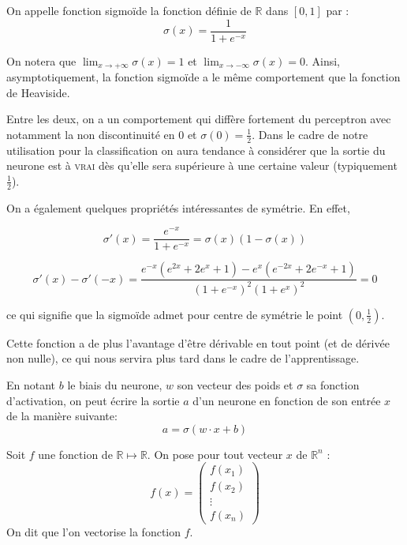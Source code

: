 \begin{definition}
On appelle fonction sigmoïde la fonction définie de $\mathbb{R}$ dans $[0, 1]$ par :
\[
\sigma(x) = \frac{1}{1 + e^{-x}}
\]
\end{definition}

On notera que $\lim_{x \to +\infty} \sigma(x) = 1$ et $\lim_{x \to -\infty} \sigma(x) = 0$. 
Ainsi, asymptotiquement, la fonction sigmoïde a le même comportement que la fonction 
de Heaviside.

Entre les deux, on a un comportement qui diffère fortement du perceptron avec notamment 
la non discontinuité en 0 et $\sigma(0) = \frac{1}{2}$. 
Dans le cadre de notre utilisation pour la classification on aura tendance 
à considérer que la sortie du neurone est à \textsc{vrai} dès qu'elle sera supérieure 
à une certaine valeur (typiquement $\frac{1}{2}$).

On a également quelques propriétés intéressantes de symétrie. En effet,

\[
\sigma'(x) = \frac{e^{-x}}{1 + e^{-x}} = \sigma(x) (1 - \sigma(x))
\]

\[
\sigma'(x) - \sigma'(-x) = \frac{e^{-x}(e^{2x} + 2 e^{x} + 1) - e^{x}(e^{-2x} + 2 e^{-x} + 1)}{(1+e^{-x})^2 (1+e^{x})^2} = 0
\]

ce qui signifie que la sigmoïde admet pour centre de symétrie le point $(0, \frac{1}{2})$.

Cette fonction a de plus l'avantage d'être dérivable en tout point (et de dérivée non nulle), 
ce qui nous servira plus tard dans le cadre de l'apprentissage.


\begin{definition}
En notant $b$ le biais du neurone, $w$ son vecteur des poids et $\sigma$ sa fonction 
d'activation, on peut écrire la sortie $a$ d'un neurone en fonction de son entrée $x$ 
de la manière suivante:
\[
a = \sigma(w \cdot x + b)
\]
\end{definition}


\begin{definition}
Soit $f$ une fonction de $\mathbb{R} \mapsto \mathbb{R}$. 
On pose pour tout vecteur $x$ de $\mathbb{R}^n$ :
\[
f(x) = 
\begin{pmatrix}
f(x_1) \\
f(x_2) \\
\vdots \\
f(x_n)
\end{pmatrix}
\]
On dit que l'on vectorise la fonction $f$.
\end{definition}

